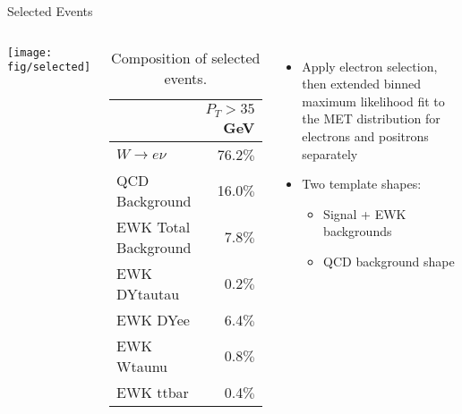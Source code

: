 \documentclass[8pt]{beamer}
\begin{document}
\begin{frame}{Selected Events}
  \begin{columns}[c]
    \texttt{[image: fig/selected]}

  \tiny{
    \begin{center}
    \begin{table}[htbp]
    \begin{tabular}{|l|r|}
    \hline
    & $P_{T}>35$ GeV \\ \hline
    $W\to e\nu$  & 76.2$\%$\\\hline
    QCD Background       & 16.0$\%$\\\hline
    EWK Total Background & 7.8$\%$ \\
    EWK DYtautau         & 0.2$\%$  \\
    EWK DYee             & 6.4$\%$  \\
    EWK Wtaunu           & 0.8$\%$ \\
    EWK ttbar            & 0.4$\%$ \\\hline
    \end{tabular}
    \caption{\label{tab:composition} Composition of selected events.}%
    \end{table}
  \end{center}
  }
  \normalsize

  \begin{itemize}
    \item Apply electron selection, then extended binned maximum likelihood fit to the MET distribution for electrons and positrons separately
    \item Two template shapes:
    \begin{itemize}
      \item Signal + EWK backgrounds 
      \item QCD background shape 
    \end{itemize}
  \end{itemize}

  \end{columns}
\end{frame}
\end{document}

